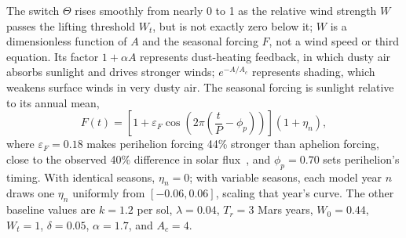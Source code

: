 The switch $\Theta$ rises smoothly from nearly 0 to 1 as the relative wind strength $W$ passes the lifting threshold $W_t$, but is not exactly zero below it; $W$ is a dimensionless function of $A$ and the seasonal forcing $F$, not a wind speed or third equation. Its factor $1 + \alpha A$ represents dust-heating feedback, in which dusty air absorbs sunlight and drives stronger winds; $e^{-A/A_c}$ represents shading, which weakens surface winds in very dusty air. The seasonal forcing is sunlight relative to its annual mean,
\begin{equation}
  F(t) = \left[1 + \varepsilon_F \cos\left(2\pi\left(\frac{t}{P} - \phi_p\right)\right)\right](1 + \eta_n),
  \label{eq:forcing}
\end{equation}
where $\varepsilon_F = 0.18$ makes perihelion forcing 44\% stronger than aphelion forcing, close to the observed 40\% difference in solar flux~\cite{smith2019}, and $\phi_p = 0.70$ sets perihelion's timing. With identical seasons, $\eta_n = 0$; with variable seasons, each model year $n$ draws one $\eta_n$ uniformly from $[-0.06, 0.06]$, scaling that year's curve. The other baseline values are $k = 1.2$ per sol, $\lambda = 0.04$, $T_r = 3$ Mars years, $W_0 = 0.44$, $W_t = 1$, $\delta = 0.05$, $\alpha = 1.7$, and $A_c = 4$.
